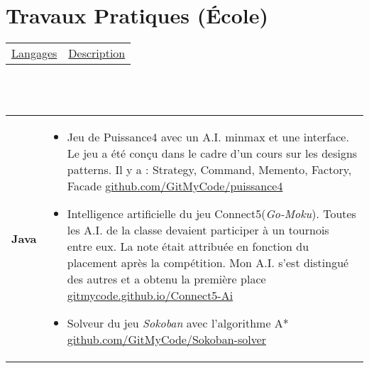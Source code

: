 \documentclass[a4paper,10pt]{extarticle}
\makeatletter
\newlength{\indicewidth}%
\newlength{\separatorcolumnwidth}%
\newlength{\maincolumnwidth}%
\newlength{\spacecvline}%
\newcommand{\cvdetailitem}[3][\spacecvline]{
\noindent\begin{tabular}
{@{}p{\indicewidth}@{\hspace{\separatorcolumnwidth}} p{\maincolumnwidth}@{}}
	\raggedright{\bf{#2}} &{ #3}%
\end{tabular}%
\vspace{-0.9em}\par\addvspace{#1}  }
\newcommand{\cvdetaillist}[3][.25em]{}
\renewcommand{\cvdetaillist}[3][.25em]{%
  \cvdetailitem[#1]{#2}{#3}}
\makeatother
\begin{document}
\clearpage














\section{Travaux Pratiques \small (École)}
\begin{tabular*}{\textwidth}{p{ }
						 	 p{ }} 
\hspace{-0.5em}\raggedright\underline{Langages} &\centering\underline{Description}
\end{tabular*}\vspace{-1em}
\\\\

\cvdetaillist{Java}{
\begin{itemize}\setlength{\itemsep}{1pt}
  \setlength{\parskip}{5pt}
  \setlength{\parsep}{0pt}
\item Jeu de Puissance4 avec un A.I. minmax et une interface. Le jeu a été conçu dans le cadre d'un cours sur les designs patterns. Il y a : Strategy, Command, Memento, Factory, Facade \small \href{https://github.com/GitMyCode/puissance4}{github.com/GitMyCode/puissance4}
\item Intelligence artificielle du jeu Connect5(\textit{Go-Moku}). Toutes les A.I. de la classe devaient participer à un tournois entre eux. La note était attribuée en fonction du placement après la compétition. Mon A.I. s'est distingué des autres et a obtenu la première place   \small \href{http://gitmycode.github.io/Connect5-Ai/}{gitmycode.github.io/Connect5-Ai} 

\item Solveur du jeu \emph{Sokoban} avec l'algorithme A*  \small \href{https://github.com/GitMyCode/Sokoban-solver}{github.com/GitMyCode/Sokoban-solver}


\end{itemize}
}
\end{document}
